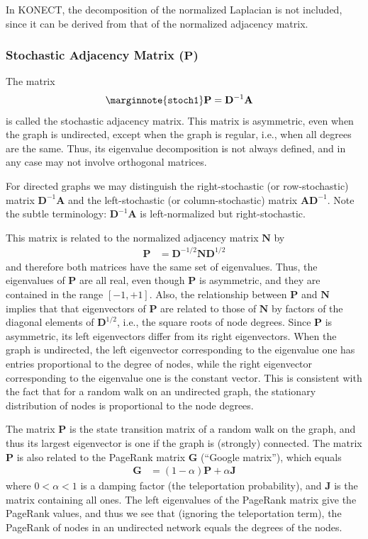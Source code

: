 \documentclass{article}
\begin{document}
In KONECT, the decomposition of the normalized Laplacian is not
included, since it can be derived from that of the normalized adjacency
matrix. 

\subsubsection{Stochastic Adjacency Matrix ($\mathbf P$)}
The matrix
\begin{align*}
  \marginnote{\texttt{stoch1}}
  \mathbf P &= \mathbf D^{-1} \mathbf A
\end{align*}
is called the stochastic adjacency matrix.  This matrix is asymmetric,
even when the graph is undirected, except when the graph is regular,
i.e., when all degrees are the same.  
Thus, its eigenvalue decomposition
is not always defined, and in any case may not involve orthogonal
matrices. 

For directed graphs we may distinguish the right-stochastic (or
row-stochastic) matrix 
$\mathbf D^{-1} \mathbf A$ and the left-stochastic (or column-stochastic)
matrix $\mathbf A \mathbf D^{-1}$.  Note the subtle terminology:
$\mathbf D^{-1} \mathbf A$ is left-normalized but right-stochastic. 

This matrix is related to the normalized adjacency matrix $\mathbf N$ by
\begin{align*}
  \mathbf P &= \mathbf D^{-1/2} \mathbf N \mathbf D^{1/2}
\end{align*}
and therefore both matrices have the same set of eigenvalues.
Thus, the eigenvalues of $\mathbf P$ are all real, even though
$\mathbf P$ is asymmetric, and they are contained in the range $[-1,+1]$. 
Also, the relationship between $\mathbf P$ and $\mathbf N$ implies that that
eigenvectors of $\mathbf P$ are related to those of 
$\mathbf N$ by factors of the diagonal elements of $\mathbf D^{1/2}$,
i.e., the square roots of node degrees. 
Since $\mathbf P$ is asymmetric, its left eigenvectors differ from its
right eigenvectors.  When the graph is undirected, the left eigenvector
corresponding to the eigenvalue one has entries proportional to the
degree of nodes, 
while the right eigenvector corresponding to the eigenvalue one 
is the constant vector.  This is consistent with the fact that for a
random walk on an undirected graph, the stationary distribution of nodes
is proportional to the node degrees. 

The matrix $\mathbf P$ is the state transition matrix of a random walk
on the graph, and thus its largest eigenvector is one if the graph is
(strongly) connected.  
The matrix $\mathbf P$ is also related to the PageRank matrix $\mathbf
G$ (``Google matrix''), which
equals 
\begin{align*}
  \mathbf G &= (1-\alpha) \mathbf P + \alpha\mathbf J
\end{align*}
where $0 < \alpha < 1$ is a damping factor (the teleportation
probability), and $\mathbf J$ is the matrix containing all ones.  The
left 
eigenvalues of the PageRank matrix give the PageRank values, and thus
we see that (ignoring the teleportation term), the PageRank of nodes in
an undirected network equals the degrees of the nodes. 
\end{document}
